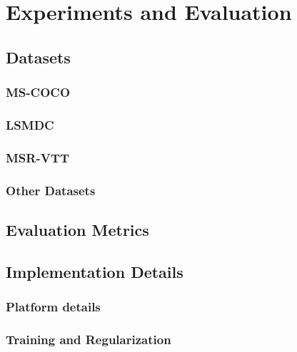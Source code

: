 \chapter{Experiments and Evaluation}
\label{chapter:experiments}
\section{Datasets}
\subsection{MS-COCO}
\subsection{LSMDC}
\subsection{MSR-VTT}
\subsection{Other Datasets}
\section{Evaluation Metrics}
\section{Implementation Details}
\subsection{Platform details}
\subsection{Training and Regularization}
